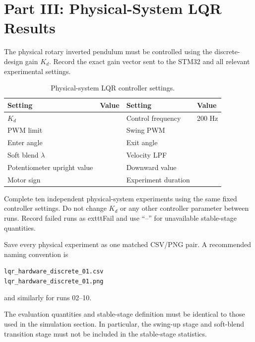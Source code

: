 \documentclass[11pt,a4paper]{article}
\newcommand{\studenttext}[1]{\begin{studentbox}\vspace{#1}\end{studentbox}}
\begin{document}
\studenttext{36mm}

\section{Part III: Physical-System LQR Results}
\label{sec:hardware}

The physical rotary inverted pendulum must be controlled using the
discrete-design gain $K_d$. Record the exact gain vector sent to the STM32 and
all relevant experimental settings.

\begin{table}[H]
\centering
\caption{Physical-system LQR controller settings.}
\label{tab:hwsettings}
\small
\begin{tabular}{ll@{\qquad}ll}
\toprule
Setting & Value & Setting & Value\\
\midrule
$K_d$ & & Control frequency & 200 Hz\\
PWM limit & & Swing PWM & \\
Enter angle & & Exit angle & \\
Soft blend $\lambda$ & & Velocity LPF & \\
Potentiometer upright value & & Downward value & \\
Motor sign & & Experiment duration & \\
\bottomrule
\end{tabular}
\end{table}

Complete ten independent physical-system experiments using the same fixed
controller settings. Do not change $K_d$ or any other controller parameter
between runs. Record failed runs as 	exttt{Fail} and use ``--'' for unavailable
stable-stage quantities.

Save every physical experiment as one matched CSV/PNG pair. A recommended
naming convention is

\begin{center}
\texttt{lqr\_hardware\_discrete\_01.csv}\\
\texttt{lqr\_hardware\_discrete\_01.png}
\end{center}

and similarly for runs 02--10.

The evaluation quantities and stable-stage definition must be identical to
those used in the simulation section. In particular, the swing-up stage and
soft-blend transition stage must not be included in the stable-stage
statistics.
\end{document}
